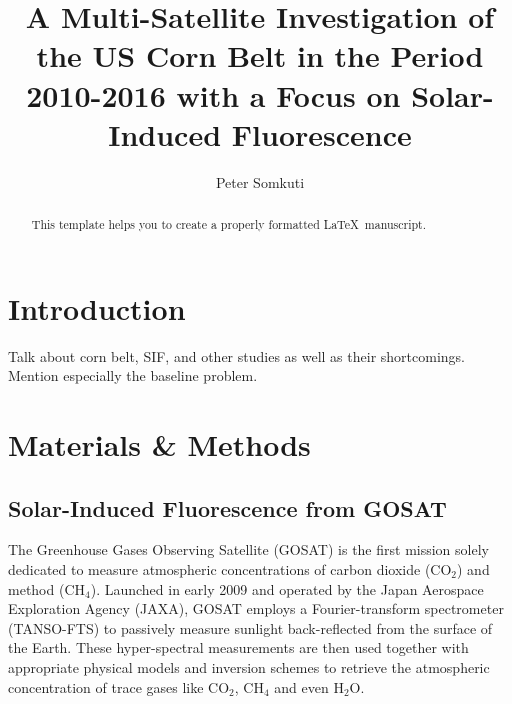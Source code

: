 \documentclass[preprint, a4paper, 10pt, times]{elsarticle}
\begin{document}
\begin{frontmatter}

\title{A Multi-Satellite Investigation of the US Corn Belt in the Period 2010-2016 with a Focus on Solar-Induced Fluorescence}

\author[uol,nceo]{Peter Somkuti}
\address[uol]{University of Leicester, Department of Physics of Astronomy, Leicester, UK}
\address[nceo]{National Centre for Earth Observation, University of Leicester, Leicester, UK}

\begin{abstract}
This template helps you to create a properly formatted \LaTeX\ manuscript.
\end{abstract}

\end{frontmatter}
\linenumbers

\section{Introduction}

Talk about corn belt, SIF, and other studies as well as their shortcomings. Mention especially the baseline problem.

\section{Materials \& Methods}
\subsection{Solar-Induced Fluorescence from GOSAT}
\label{sec:GOSAT_SIF}

The Greenhouse Gases Observing Satellite (GOSAT) is the first mission solely dedicated to measure atmospheric concentrations of carbon dioxide (CO$_2$) and method (CH$_4$). Launched in early 2009 and operated by the Japan Aerospace Exploration Agency (JAXA), GOSAT employs a Fourier-transform spectrometer (TANSO-FTS) to passively measure sunlight back-reflected from the surface of the Earth. These hyper-spectral measurements are then used together with appropriate physical models and inversion schemes to retrieve the atmospheric concentration of trace gases like CO$_2$, CH$_4$ and even H$_2$O.
\end{document}
